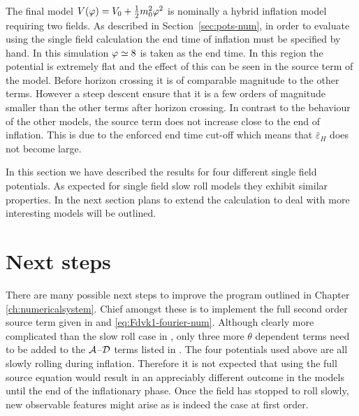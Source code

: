 The final model $V(\varphi)=V_0 + \frac{1}{2} m_0^2 \varphi^2$ is nominally a hybrid inflation model requiring two fields.
As described in Section~\ref{sec:pots-num}, in order to evaluate using the single field
calculation the end time of inflation must be specified by hand. In this simulation $\varphi\simeq 8$
is taken as the end time. In this region the potential is extremely flat and the effect of this can
be seen in the source term of the model. Before horizon crossing it is of comparable magnitude to
the other terms. However a steep descent ensure that it is a few orders of magnitude smaller than
the other terms after horizon crossing. In contrast to the behaviour of the other models, the source
term does not increase close to the end of inflation. This is due to the enforced end time cut-off
which means that $\bar{\varepsilon}_H$ does not become large.

In this section we have described the results for four different single field potentials. As
expected for single field slow roll models they exhibit similar properties. In the next section
plans to extend the calculation to deal with more interesting models will be outlined.

\section{Next steps}
\label{sec:next-res}

There are many possible next steps to improve the program outlined in
Chapter \ref{ch:numericalsystem}. Chief amongst these is to implement the
full second order source term given in  and
\eqref{eq:Fdvk1-fourier-num}. Although clearly
more complicated than the slow roll case in ,
only three more $\theta$ dependent terms need to be added to the $\mathcal{A}$--$\mathcal{D}$ terms
listed in .  The four potentials used above are all slowly rolling
during inflation. Therefore it is not expected that
using the full source equation would result in an appreciably
different outcome in the models until the end of the inflationary phase. Once
the field has stopped to roll slowly, new observable features might
arise as is indeed the case at first order. 


